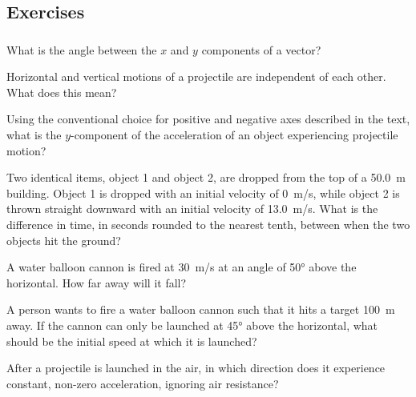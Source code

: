 \documentclass[main-physics.tex]{subfiles}
\begin{document}
\endsolution

\subsection{Exercises}

\subsubsection*{}

\begin{exercise} \label{90PABl}
    What is the angle between the $x$ and $y$ components of a vector?
\end{exercise}

\begin{exercise}
    Horizontal and vertical motions of a projectile are independent of each other. What does this mean?
\end{exercise}

\begin{exercise} \label{YYBBp5}
    Using the conventional choice for positive and negative axes described in the text, what is the $y$-component of the acceleration of an object experiencing projectile motion?
\end{exercise}

\begin{exercise}  \label{agp59Z}
    Two identical items, object 1 and object 2, are dropped from the top of a \SI{50.0}{m} building. Object 1 is dropped with an initial velocity of \SI{0}{m/s}, while object 2 is thrown straight downward with an initial velocity of \SI{13.0}{m/s}. What is the difference in time, in seconds rounded to the nearest tenth, between when the two objects hit the ground?
\end{exercise}

\begin{exercise} \label{Xu3FK9}
    A water balloon cannon is fired at \SI{30}{m/s} at an angle of \ang{50} above the horizontal. How far away will it fall?
\end{exercise}

\begin{exercise} \label{piJ9kJ}
    A person wants to fire a water balloon cannon such that it hits a target \SI{100}{m} away. If the cannon can only be launched at \ang{45} above the horizontal, what should be the initial speed at which it is launched?
\end{exercise}

\begin{exercise} \label{sy5RGT}
    After a projectile is launched in the air, in which direction does it experience constant, non-zero acceleration, ignoring air resistance?
\end{exercise}
\end{document}

